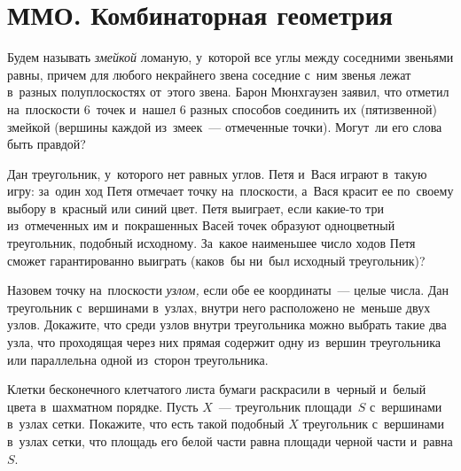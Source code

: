 
\section*{ММО. Комбинаторная геометрия}


\begin{problems}

\item
Будем называть \emph{змейкой} ломаную, у~которой все углы между соседними
звеньями равны, причем для любого некрайнего звена соседние с~ним звенья лежат
в~разных полуплоскостях от~этого звена.
Барон Мюнхгаузен заявил, что отметил на~плоскости 6~точек и~нашел 6 разных
способов соединить их (пятизвенной) змейкой (вершины каждой из~змеек~---
отмеченные точки).
Могут~ли его слова быть правдой?

\item
Дан треугольник, у~которого нет равных углов.
Петя и~Вася играют в~такую игру: за~один ход Петя отмечает точку на~плоскости,
а~Вася красит ее по~своему выбору в~красный или синий цвет.
Петя выиграет, если какие-то три из~отмеченных им и~покрашенных Васей точек
образуют одноцветный треугольник, подобный исходному.
За~какое наименьшее число ходов Петя сможет гарантированно выиграть
(каков~бы ни~был исходный треугольник)?

\item
Назовем точку на~плоскости \emph{узлом,} если обе ее координаты~--- целые
числа.
Дан треугольник с~вершинами в~узлах, внутри него расположено не~меньше двух
узлов.
Докажите, что среди узлов внутри треугольника можно выбрать такие два узла, что
проходящая через них прямая содержит одну из~вершин треугольника или
параллельна одной из~сторон треугольника.

\item
Клетки бесконечного клетчатого листа бумаги раскрасили в~черный и~белый цвета
в~шахматном порядке.
Пусть $X$~--- треугольник площади~$S$ с~вершинами в~узлах сетки.
Покажите, что есть такой подобный $X$ треугольник с~вершинами в~узлах сетки,
что площадь его белой части равна площади черной части и~равна $S$.

\end{problems}

